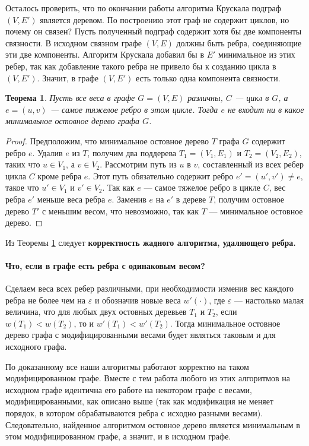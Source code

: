 \documentclass[a4paper,12pt]{article}
\newtheorem*{theorem}{Теорема}
\begin{document}
Осталось проверить, что по окончании работы алгоритма Крускала подграф $(V, E')$ является деревом. По построению этот граф не содержит циклов, но почему он связен? Пусть полученный подграф содержит хотя бы две компоненты связности. В исходном связном графе $(V, E)$ должны быть ребра, соединяющие эти две компоненты. Алгоритм Крускала добавил бы в $E'$ минимальное из этих ребер, так как добавление такого ребра не привело бы к созданию цикла в $(V, E')$. Значит, в графе $(V, E')$ есть только одна компонента связности.

	\begin{theorem}\label{theorem:cycle}%
	Пусть все веса в графе $G = (V, E)$ различны, $C$ --- цикл в $G$, а $e = (u, v)$ --- самое тяжелое ребро в этом цикле. Тогда $e$ не входит ни в какое минимальное остовное дерево графа $G$.
	\end{theorem}
	\begin{proof}
		Предположим, что минимальное остовное дерево $T$ графа $G$ содержит ребро $e$. Удалив $e$ из $T$, получим два поддерева $T_1 = (V_1, E_1)$ и $T_2 = (V_2, E_2)$, таких что $u \in V_1$, а $v \in V_2$. Рассмотрим путь из $u$ в $v$, составленный из всех ребер цикла $C$ кроме ребра $e$. Этот путь обязательно содержит ребро $e' = (u', v') \neq e$, такое что $u' \in V_1$ и $v' \in V_2$. Так как $e$ --- самое тяжелое ребро в цикле $C$, вес ребра $e'$ меньше веса ребра $e$. Заменив $e$ на $e'$ в дереве $T$, получим остовное дерево $T'$ с меньшим весом, что невозможно, так как $T$ --- минимальное остовное дерево.
	\end{proof}

Из Теоремы \ref{theorem:cycle} следует \textbf{корректность жадного алгоритма, удаляющего ребра.}

\paragraph{Что, если в графе есть ребра с одинаковым весом?} Сделаем веса всех ребер различными, при необходимости изменив вес каждого ребра не более чем на $\varepsilon$ и обозначив новые веса $w'(\cdot)$, где $\varepsilon$ --- настолько малая величина, что для любых двух остовных деревьев $T_1$ и $T_2$, если $w(T_1) < w(T_2)$, то и $w'(T_1) < w'(T_2)$. Тогда минимальное остовное дерево графа с модифицированными весами будет являться таковым и для исходного графа.

По доказанному все наши алгоритмы работают корректно на таком модифицированном графе. Вместе с тем работа любого из этих алгоритмов на исходном графе идентична его работе на некотором графе с весами, модифицированными, как описано выше (так как модификация не меняет порядок, в котором обрабатываются ребра с исходно разными весами). Следовательно, найденное алгоритмом остовное дерево является минимальным в этом модифицированном графе, а значит, и в исходном графе.
\end{document}
